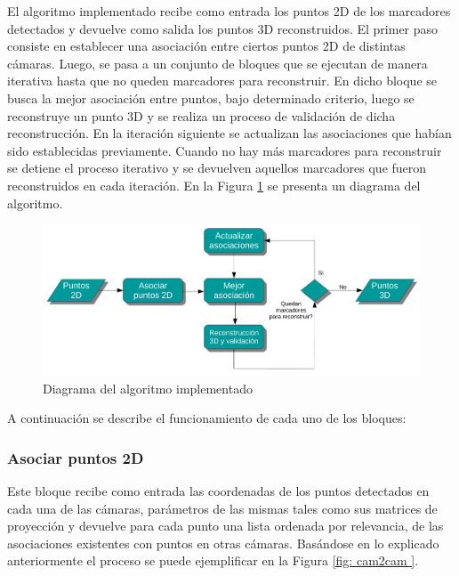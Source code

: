 El algoritmo implementado recibe como entrada los puntos 2D de los marcadores detectados y devuelve como salida los puntos 3D reconstruidos. El primer paso consiste en establecer una asociación entre ciertos puntos 2D de distintas cámaras. Luego, se pasa a un conjunto de bloques que se ejecutan de manera iterativa hasta que no queden marcadores para reconstruir. En dicho bloque se busca la mejor asociación entre puntos, bajo determinado criterio, luego se reconstruye un punto 3D y se realiza un proceso de validación de dicha reconstrucción. En la iteración siguiente se actualizan las asociaciones que habían sido establecidas previamente. Cuando no hay más marcadores para reconstruir se detiene el proceso iterativo y se devuelven aquellos marcadores que fueron reconstruidos en cada iteración. En la Figura \ref{fig: diagrama algoritmo} se presenta un diagrama del algoritmo.\\

\begin{figure}[H]
\hspace{-1cm}
\includegraphics[scale=0.6]{img/Reconstruccion/diagrama_algoritmo.pdf}
\caption{Diagrama del algoritmo implementado}
\label{fig: diagrama algoritmo}
\end{figure}

A continuación se describe el funcionamiento de cada uno de los bloques:

\subsubsection{Asociar puntos 2D}

Este bloque recibe como entrada las coordenadas de los puntos detectados en cada una de las cámaras, parámetros de las mismas tales como sus matrices de proyección y devuelve para cada punto una lista ordenada por relevancia, de las asociaciones existentes con puntos en otras cámaras.
Basándose en lo explicado anteriormente el proceso  se puede ejemplificar  en la Figura \ref{fig: cam2cam }. \\

